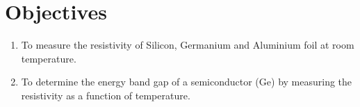 \section{Objectives}
	\begin{enumerate}
		\item To measure the resistivity of Silicon, Germanium and Aluminium foil at room temperature.
		\item To determine the energy band gap of a semiconductor (Ge) by measuring the resistivity as a function of temperature.
	\end{enumerate}